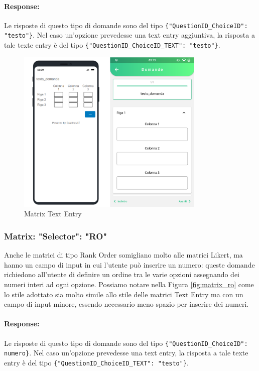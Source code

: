 \paragraph{Response:}
Le risposte di questo tipo di domande sono del tipo \texttt{\{"QuestionID\_ChoiceID": "testo"\}}. Nel caso un'opzione prevedesse una text entry aggiuntiva, la risposta a tale texte entry è del tipo \texttt{\{"QuestionID\_ChoiceID\_TEXT": "testo"\}}.

\begin{figure}[h!]
\centering
\includegraphics[width=0.8\textwidth]{img/matrix_te}
\caption{Matrix Text Entry}
\label{fig:matrix_te}
\end{figure}

\clearpage
\subsubsection{Matrix: "Selector": "RO"}
Anche le matrici di tipo Rank Order somigliano molto alle matrici Likert, ma hanno un campo di input in cui l'utente può inserire un numero: queste domande richiedono all'utente di definire un ordine tra le varie opzioni assegnando dei numeri interi ad ogni opzione. Possiamo notare nella Figura \ref{fig:matrix_ro} come lo stile adottato sia molto simile allo stile delle matrici Text Entry ma con un campo di input minore, essendo necessario meno spazio per inserire dei numeri.

\paragraph{Response:}
Le risposte di questo tipo di domande sono del tipo \texttt{\{"QuestionID\_ChoiceID": numero\}}. Nel caso un'opzione prevedesse una text entry, la risposta a tale texte entry è del tipo \texttt{\{"QuestionID\_ChoiceID\_TEXT": "testo"\}}.

